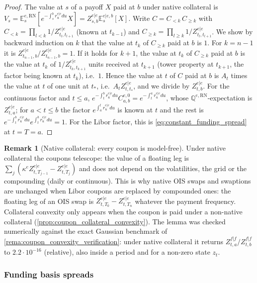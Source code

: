 \documentclass[11pt,english]{amsart}
\newcommand{\RN}{\mathrm{RN}}
\newcommand{\EE}{\mathbb{E}}
\newcommand{\QQ}{\mathbb{Q}}
\theoremstyle{definition}
\newtheorem{rema}{Remark}
\begin{document}
\begin{proof}
The value at $s$ of a payoff $X$ paid at $b$ under native collateral is $V_s = \EE^{e,\RN}_s[e^{-\int_s^b r^{e|e}_udu}X] = Z^{e|e}_{s,b}\EE^{e|e,b}_s[X]$. Write $C = C_{<k}\,C_{\ge k}$ with $C_{<k} = \prod_{l<k}1/Z^{e|e}_{t_l,t_{l+1}}$ (known at $t_{k-1}$) and $C_{\ge k} = \prod_{l\ge k}1/Z^{e|e}_{t_l,t_{l+1}}$. We show by backward induction on $k$ that the value at $t_k$ of $C_{\ge k}$ paid at $b$ is $1$. For $k = n-1$ it is $Z^{e|e}_{t_{n-1},b}/Z^{e|e}_{t_{n-1},b} = 1$. If it holds for $k+1$, the value at $t_k$ of $C_{\ge k}$ paid at $b$ is the value at $t_k$ of $1/Z^{e|e}_{t_k,t_{k+1}}$ units received at $t_{k+1}$ (tower property at $t_{k+1}$, the factor being known at $t_k$), i.e.\ $1$. Hence the value at $t$ of $C$ paid at $b$ is $A_t$ times the value at $t$ of one unit at $t_*$, i.e.\ $A_tZ^{e|e}_{t,t_*}$, and we divide by $Z^{e|e}_{t,b}$. For the continuous factor and $t\le a$, $e^{-\int_t^br^{e|e}_udu}C^{e,0}_{a,b} = e^{-\int_t^ar^{e|e}_udu}$, whose $\QQ^{e,\RN}$-expectation is $Z^{e|e}_{t,a}$; for $a<t\le b$ the factor $e^{\int_a^tr^{e|e}_udu}$ is known at $t$ and the rest is $e^{-\int_t^b r^{e|e}_udu}e^{\int_t^b r^{e|e}_udu} = 1$. For the Libor factor, this is \eqref{eq:constant_funding_spread} at $t = T = a$.
\end{proof}

\begin{rema}[Native collateral: every coupon is model-free]\label{rema:coupon_native_model_free}
Under native collateral the coupons telescope: the value of a floating leg is $\sum_j(\kappa^eZ^{e|e}_{t,T_{j-1}} - Z^{e|e}_{t,T_j})$ and does not depend on the volatilities, the grid or the compounding (daily or continuous). This is why native OIS swaps and swaptions are unchanged when Libor coupons are replaced by compounded ones: the floating leg of an OIS swap is $Z^{e|e}_{t,T_0}-Z^{e|e}_{t,T_n}$ whatever the payment frequency. Collateral convexity only appears when the coupon is paid under a non-native collateral (\autoref{prop:coupon_collateral_convexity}). The lemma was checked numerically against the exact Gaussian benchmark of \autoref{rema:coupon_convexity_verification}: under native collateral it returns $Z^{f|f}_{t,a}/Z^{f|f}_{t,b}$ to $2.2\cdot10^{-16}$ (relative), also inside a period and for a non-zero state $z_t$.
\end{rema}




\subsubsection{Funding basis spreads}
\end{document}
